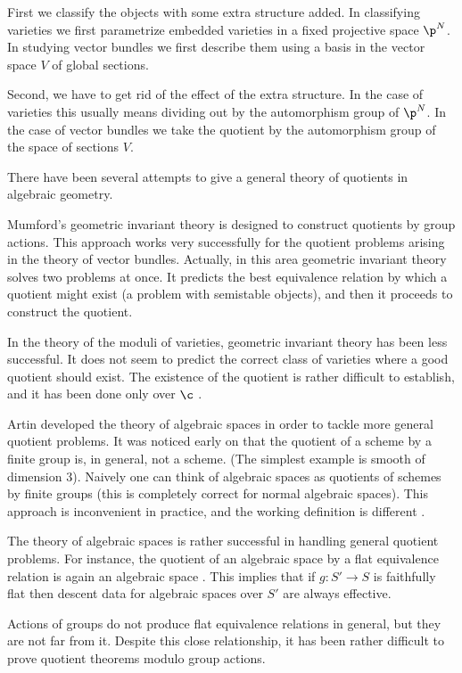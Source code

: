First we classify  the objects with some extra structure added. In
classifying varieties  we first parametrize  embedded varieties in a fixed
projective space $\p^N$.  In studying vector bundles we first describe them
using a basis in the vector space  $V$ of global sections.

Second, we have to get rid of the effect of the extra structure. In the case
of varieties this usually means dividing out by the automorphism group of
$\p^N$. In the case of vector bundles we   take the quotient by the
automorphism group of the space of sections $V$.

There have been several attempts to give a general theory of quotients in
algebraic geometry.

Mumford's geometric invariant theory is designed to
construct quotients by group actions. This approach works very successfully
for the quotient problems arising in the theory of vector bundles. Actually,
in this area geometric invariant theory solves two problems at once. It
predicts the best equivalence relation by which a quotient might exist (a
problem with semistable objects), and then it proceeds to construct the
quotient.

In the theory of the moduli of varieties, geometric invariant theory
has been less successful. It does not seem to predict the  correct class of
varieties where a good quotient should exist. The existence of the quotient
is rather difficult to establish, and it has been done only over $\c$
\cite{Viehweg95}.

Artin developed the theory of algebraic spaces in order to tackle more general
quotient problems. It was noticed early on that the quotient of a scheme by a
finite group is, in general, not a scheme. (The simplest example is smooth
of dimension 3). Naively one can think of algebraic spaces as
quotients of schemes by finite groups (this is completely correct for normal
algebraic spaces). This approach is   inconvenient in practice, and the
working definition is different \cite{Knutson71}.

The theory of algebraic spaces is rather successful in handling general
quotient problems. For instance, the quotient of an algebraic space by a flat
equivalence relation is again an algebraic space \cite{Artin74}.  This
implies that if $g:S'\to S$ is faithfully flat then  descent data for
algebraic spaces over $S'$ are always effective.

Actions of groups do not produce flat equivalence relations in general, but
they are not far from it. Despite this  close relationship, it has
been rather difficult to prove quotient theorems modulo group actions.

